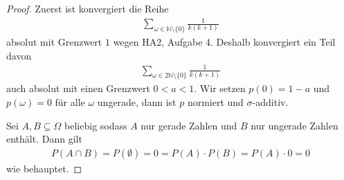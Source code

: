 \documentclass[fleqn,draft,a5paper]{article}
\theoremstyle{remark}
\begin{document}
\begin{proof}
  Zuerst ist konvergiert die Reihe
  \begin{align*}
    \sum_{\omega \in \mathbb{N} \setminus \{0\}}\frac{1}{k(k+1)}
  \end{align*}
  absolut mit Grenzwert $1$ wegen HA2, Aufgabe 4.
  Deshalb konvergiert ein Teil davon
  \begin{align*}
    \sum_{\omega \in 2 \mathbb{N} \setminus \{0\}}\frac{1}{k(k+1)}
  \end{align*}
  auch absolut mit einen Grenzwert $0 < a < 1$.  Wir setzen
  $p(0) = 1 - a$ und $p(\omega)=0$ für alle $\omega$ ungerade, dann ist
  $p$ normiert und $\sigma$-additiv.

  Sei $A, B \subseteq \Omega$ beliebig sodass $A$ nur gerade Zahlen und
  $B$ nur ungerade Zahlen enthält.  Dann gilt
  \begin{align*}
    P(A \cap B) = P(\emptyset) = 0 = P(A) \cdot P(B) = P(A) \cdot 0 = 0
  \end{align*}
  wie behauptet.
\end{proof}
\end{document}
